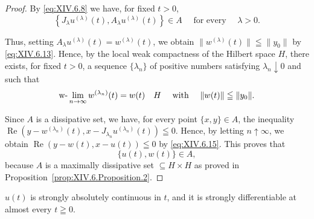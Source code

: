 \begin{proof}
 By \eqref{eq:XIV.6.8} we have, for fixed $t > 0$, 
\begin{equation}\label{eq:XIV.6.16}
\left\{J _{\lambda} u ^{(\lambda)} (t), A _{\lambda} u ^{(\lambda)} (t) \right\} \in A \quad \text{ for every } \quad \lambda > 0. \end{equation}

Thus, setting $A_{\lambda}u^{(\lambda)}(t) = w^{(\lambda)}(t)$, we obtain $\|w^{(\lambda)}(t)\| \leqq \|y_0\|$ by \eqref{eq:XIV.6.13}. Hence, by the local weak compactness of the Hilbert space $H$, there exists, for fixed $t > 0$, a sequence $\{\lambda_n\}$ of positive numbers satisfying $\lambda_n \downarrow 0$ and such that 
\begin{equation}\label{eq:XIV.6.17}
\text{w-}\lim _{n \to \infty} w ^ {(\lambda_{n})} (t) = w (t) \quad H \quad \text{ with } \quad \| w (t) \| \leqq \| y _{0} \|.
\end{equation}

Since $A$ is a dissipative set, we have, for every point $\{x, y\} \in A$, the inequality $\operatorname{Re}(y - w^{(\lambda_n)}(t), x - J_{\lambda_n}u^{(\lambda_n)}(t)) \leqq 0$. Hence, by letting $n \uparrow \infty$, we obtain $\operatorname{Re}(y - w(t), x - u(t)) \leqq 0$ by \eqref{eq:XIV.6.15}. This proves that 
\begin{equation}\label{eq:XIV.6.18}
\{u (t), w (t) \} \in A,
\end{equation}
because $A$ is a maximally dissipative set $\subseteq H \times H$ as proved in Proposition~\ref{prop:XIV.6.Proposition.2}. 
\end{proof}

\begin{lemma}\label{lem:XIV.6.Lemma.5} $u(t)$ is strongly absolutely continuous in $t$, and it is strongly differentiable at almost every $t \geqq 0$. 
\end{lemma}

